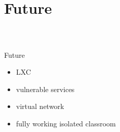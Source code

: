 \section{Future}
%
\begin{frame}
\frametitle{\\}
%
{\LARGE Future \newline}
\begin{itemize}
  \item LXC
  \item vulnerable services
  \item virtual network
  \item fully working isolated classroom
\end{itemize}
\end{frame}
